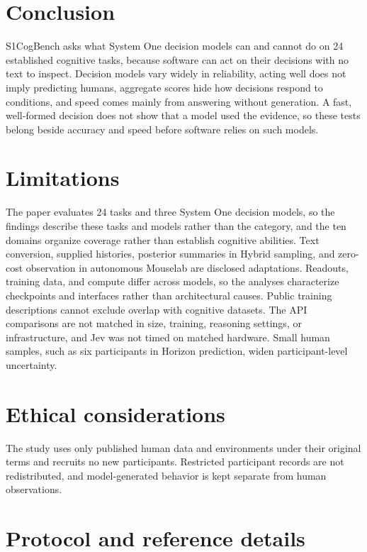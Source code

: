 \documentclass[11pt,a4paper]{article}
\newcommand{\bench}{S1CogBench}
\begin{document}
\section{Conclusion}
\label{sec:conclusion}
\bench{} asks what System One decision models can and cannot do on 24 established cognitive tasks, because software can act on their decisions with no text to inspect. Decision models vary widely in reliability, acting well does not imply predicting humans, aggregate scores hide how decisions respond to conditions, and speed comes mainly from answering without generation. A fast, well-formed decision does not show that a model used the evidence, so these tests belong beside accuracy and speed before software relies on such models.

\section*{Limitations}
The paper evaluates 24 tasks and three System One decision models, so the findings describe these tasks and models rather than the category, and the ten domains organize coverage rather than establish cognitive abilities. Text conversion, supplied histories, posterior summaries in Hybrid sampling, and zero-cost observation in autonomous Mouselab are disclosed adaptations. Readouts, training data, and compute differ across models, so the analyses characterize checkpoints and interfaces rather than architectural causes. Public training descriptions cannot exclude overlap with cognitive datasets. The API comparisons are not matched in size, training, reasoning settings, or infrastructure, and Jev was not timed on matched hardware. Small human samples, such as six participants in Horizon prediction, widen participant-level uncertainty.

\section*{Ethical considerations}
The study uses only published human data and environments under their original terms and recruits no new participants. Restricted participant records are not redistributed, and model-generated behavior is kept separate from human observations.


\appendix
\raggedbottom
\section{Protocol and reference details}
\label{app:protocol}\label{app:details}\label{app:selected-api-extension}
\end{document}

